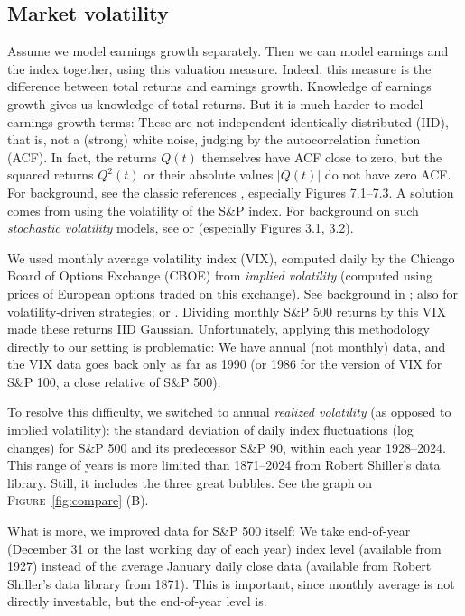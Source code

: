 \documentclass[12pt]{amsart}
\begin{document}
\subsection{Market volatility} Assume we model earnings growth separately. Then we can model earnings and the index together, using this valuation measure. Indeed, this measure is the difference between total returns and earnings growth. Knowledge of earnings growth gives us knowledge of total returns. But it is much harder to model earnings growth terms: These are not independent identically distributed (IID), that is, not a (strong) white noise, judging by the autocorrelation function (ACF). In fact, the returns $Q(t)$ themselves have ACF close to zero, but the squared returns $Q^2(t)$ or their absolute values $|Q(t)|$ do not have zero ACF. For background, see the classic references \cite[Chapter 7]{Series}, especially Figures 7.1--7.3. A solution comes from using the volatility of the S\&P index. For background on such {\it stochastic volatility} models, see \cite[Chapter 7, Section 4]{Series} or \cite[Chapter 3, Section 1]{Textbook} (especially Figures 3.1, 3.2). 

We used monthly average volatility index (VIX), computed daily by the Chicago Board of Options Exchange (CBOE) from {\it implied volatility} (computed using prices of European options traded on this exchange). See background in \cite[Chapter 7, Section 2, Figure 7.3]{Ang}; also \cite[Chapter 10, Section 1]{Ang} for volatility-driven strategies; or \cite[Chapter 8, Section 4, Figure 8.5]{Ilmanen}. Dividing monthly S\&P 500 returns by this VIX made these returns IID Gaussian. Unfortunately, applying this methodology directly to our setting is problematic: We have annual (not monthly) data, and the VIX data goes back only as far as 1990 (or 1986 for the version of VIX for S\&P 100, a close relative of S\&P 500). 

To resolve this difficulty, we switched to annual {\it realized volatility} (as opposed to implied volatility): the standard deviation of daily index fluctuations (log changes) for S\&P 500 and its predecessor S\&P 90, within each year 1928--2024. This range of years is more limited than 1871--2024 from Robert Shiller's data library. Still, it includes the three great bubbles. See the graph on \textsc{Figure}~\ref{fig:compare} (B). 

What is more, we improved data for S\&P 500 itself: We take end-of-year (December 31 or the last working day of each year) index level (available from 1927) instead of the average January daily close data (available from Robert Shiller's data library from 1871). This is important, since monthly average is not directly investable, but the end-of-year level is. 
\end{document}
